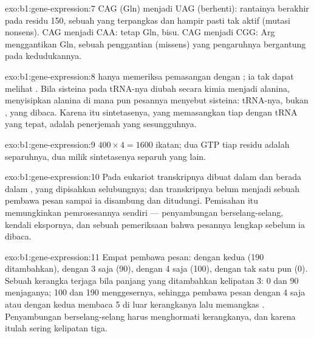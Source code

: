 \begin{solution}{exo:b1:gene-expression:7}
CAG (Gln) menjadi UAG (berhenti): rantainya berakhir pada residu 150,
sebuah  yang terpangkas dan hampir pasti tak aktif (mutasi
nonsens). CAG menjadi CAA: tetap Gln, bisu. CAG menjadi CGG: Arg
menggantikan Gln, sebuah penggantian (missens) yang pengaruhnya
bergantung pada kedudukannya.
\end{solution}

\begin{solution}{exo:b1:gene-expression:8}
 hanya memeriksa pemasangan  dengan ; ia
tak dapat melihat . Bila sisteina pada tRNA-nya diubah
secara kimia menjadi alanina,  menyisipkan alanina di mana
pun pesannya menyebut sisteina: tRNA-nya, bukan , yang
dibaca. Karena itu sintetasenya, yang memasangkan tiap 
dengan tRNA yang tepat, adalah penerjemah yang sesungguhnya.
\end{solution}

\begin{solution}{exo:b1:gene-expression:9}
$400\times 4 = 1600$ ikatan; dua GTP  tiap residu adalah
separuhnya, dua milik sintetasenya separuh yang lain.
\end{solution}

\begin{solution}{exo:b1:gene-expression:10}
Pada eukariot transkripnya dibuat dalam  dan  berada
dalam , yang dipisahkan selubungnya; dan transkripnya belum
menjadi sebuah pembawa pesan sampai ia disambung dan ditudungi.
Pemisahan itu memungkinkan pemrosesannya sendiri --- penyambungan
berselang-selang, kendali ekspornya, dan sebuah pemeriksaan bahwa
pesannya lengkap sebelum ia dibaca.
\end{solution}

\begin{solution}{exo:b1:gene-expression:11}
Empat pembawa pesan: dengan kedua  (190 
ditambahkan), dengan 3 saja (90), dengan 4 saja (100), dengan tak satu
pun (0). Sebuah kerangka terjaga bila panjang yang ditambahkan
kelipatan 3: 0 dan 90 menjaganya; 100 dan 190 menggesernya, sehingga
pembawa pesan dengan  4 saja atau dengan kedua  membaca
 5 di luar kerangkanya lalu memangkas . Penyambungan
berselang-selang harus menghormati kerangkanya, dan karena itulah 
sering kelipatan tiga.
\end{solution}

